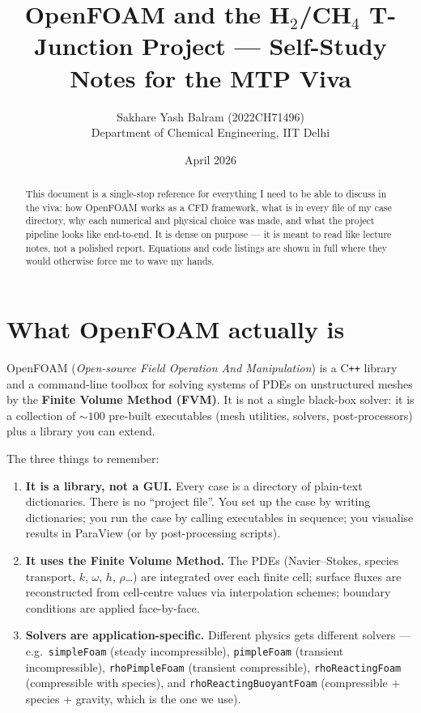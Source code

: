 \documentclass[11pt,a4paper]{article}
\title{\sffamily\bfseries OpenFOAM and the H$_2$/CH$_4$ T-Junction Project --- Self-Study Notes for the MTP Viva}
\author{Sakhare Yash Balram (2022CH71496)\\
Department of Chemical Engineering, IIT Delhi}
\date{April 2026}
\begin{document}
\maketitle

\begin{abstract}
\noindent
This document is a single-stop reference for everything I need to be
able to discuss in the viva: how OpenFOAM works as a CFD framework,
what is in every file of my case directory, why each numerical and
physical choice was made, and what the project pipeline looks like
end-to-end. It is dense on purpose --- it is meant to read like
lecture notes, not a polished report. Equations and code listings are
shown in full where they would otherwise force me to wave my hands.
\end{abstract}

\tableofcontents
\clearpage

\section{What OpenFOAM actually is}

OpenFOAM (\emph{Open-source Field Operation And Manipulation}) is a
C\texttt{++} library and a command-line toolbox for solving systems of
PDEs on unstructured meshes by the \textbf{Finite Volume Method
(FVM)}. It is not a single black-box solver: it is a collection of
$\sim 100$ pre-built executables (mesh utilities, solvers,
post-processors) plus a library you can extend.

The three things to remember:

\begin{enumerate}[leftmargin=1.5em]
    \item \textbf{It is a library, not a GUI.}\;
    Every case is a directory of plain-text dictionaries. There is no
    ``project file''. You set up the case by writing dictionaries; you
    run the case by calling executables in sequence; you visualise
    results in ParaView (or by post-processing scripts).
    \item \textbf{It uses the Finite Volume Method.}\;
    The PDEs (Navier--Stokes, species transport, $k$, $\omega$, $h$,
    $\rho$\dots) are integrated over each finite cell; surface fluxes
    are reconstructed from cell-centre values via interpolation
    schemes; boundary conditions are applied face-by-face.
    \item \textbf{Solvers are application-specific.}\;
    Different physics gets different solvers --- e.g.\ \texttt{simpleFoam}
    (steady incompressible), \texttt{pimpleFoam} (transient
    incompressible), \texttt{rhoPimpleFoam} (transient compressible),
    \texttt{rhoReactingFoam} (compressible with species), and
    \texttt{rhoReactingBuoyantFoam} (compressible $+$ species $+$
    gravity, which is the one we use).
\end{enumerate}
\end{document}
